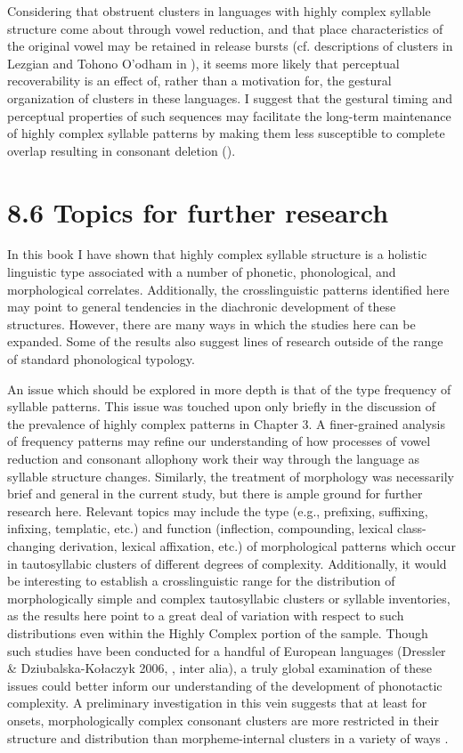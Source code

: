   Considering that obstruent clusters in languages with highly complex syllable structure come about through vowel reduction, and that place characteristics of the original vowel may be retained in release bursts (cf. descriptions of clusters in Lezgian and Tohono O’odham in ), it seems more likely that perceptual recoverability is an effect of, rather than a motivation for, the gestural organization of clusters in these languages. I suggest that the gestural timing and perceptual properties of such sequences may facilitate the long-term maintenance of highly complex syllable patterns by making them less susceptible to complete overlap resulting in consonant deletion (\citealt{BrowmanGoldstein1990}).

\section{8.6 Topics for further research}

  In this book I have shown that highly complex syllable structure is a holistic linguistic type associated with a number of phonetic, phonological, and morphological correlates. Additionally, the crosslinguistic patterns identified here may point to general tendencies in the diachronic development of these structures. However, there are many ways in which the studies here can be expanded. Some of the results also suggest lines of research outside of the range of standard phonological typology.

  An issue which should be explored in more depth is that of the type frequency of syllable patterns. This issue was touched upon only briefly in the discussion of the prevalence of highly complex patterns in Chapter 3. A finer-grained analysis of frequency patterns may refine our understanding of how processes of vowel reduction and consonant allophony work their way through the language as syllable structure changes. Similarly, the treatment of morphology was necessarily brief and general in the current study, but there is ample ground for further research here. Relevant topics may include the type (e.g., prefixing, suffixing, infixing, templatic, etc.) and function (inflection, compounding, lexical class-changing derivation, lexical affixation, etc.) of morphological patterns which occur in tautosyllabic clusters of different degrees of complexity. Additionally, it would be interesting to establish a crosslinguistic range for the distribution of morphologically simple and complex tautosyllabic clusters or syllable inventories, as the results here point to a great deal of variation with respect to such distributions even within the Highly Complex portion of the sample. Though such studies have been conducted for a handful of European languages (Dressler \& Dziubalska-Kołaczyk 2006, \citealt{DresslerEtAl2010}, inter alia), a truly global examination of these issues could better inform our understanding of the development of phonotactic complexity. A preliminary investigation in this vein suggests that at least for onsets, morphologically complex consonant clusters are more restricted in their structure and distribution than morpheme-internal clusters in a variety of ways \citep{Easterday2019}.

